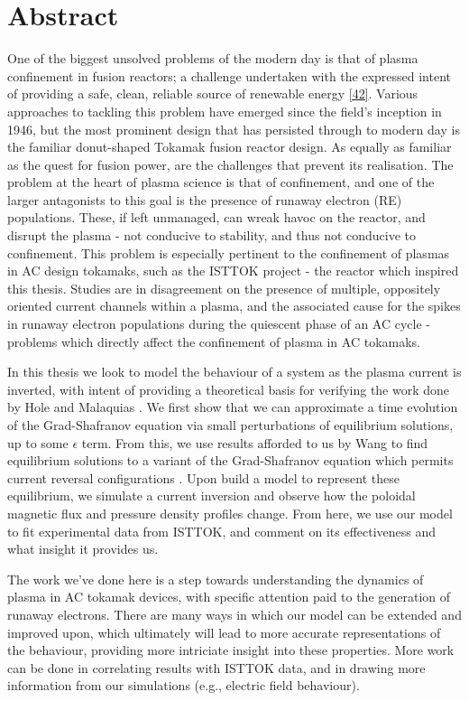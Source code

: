 \chapter*{Abstract}\label{abstract}


One of the biggest unsolved problems of the modern day is that of plasma confinement in fusion reactors; a challenge 
undertaken with the expressed intent of providing a safe, clean, reliable source of renewable energy \href{https://www.youtube.com/watch?v=dQw4w9WgXcQ}{[42]}. Various approaches 
to tackling this problem have emerged since the field's inception in 1946, but the most prominent design that has 
persisted through to modern day is the familiar donut-shaped Tokamak fusion reactor design. As equally as familiar as 
the quest for fusion power, are the challenges that prevent its realisation. The problem at the heart of plasma science is that 
of confinement, and one of the larger antagonists to this goal is the presence of runaway electron (RE) populations. 
These, if left unmanaged, can wreak havoc on the reactor, and disrupt the plasma - not conducive to stability, and thus 
not conducive to confinement. This problem is especially pertinent to the confinement of plasmas in AC design tokamaks, such as 
the ISTTOK project - the reactor which inspired this thesis. Studies are in disagreement on the presence of multiple, oppositely 
oriented current channels within a plasma, and the associated cause for the spikes in runaway electron populations during the 
quiescent phase of an AC cycle \cite{malaquias-matthew} - problems which directly affect the confinement of plasma in AC tokamaks. 

In this thesis we look to model the behaviour of a system as the plasma current is inverted, with intent of providing 
a theoretical basis for verifying the work done by Hole and Malaquias \cite{malaquias-matthew}. We first show that we 
can approximate a time evolution of the Grad-Shafranov equation via small perturbations of equilibrium solutions, up to 
some $\epsilon$ term. From this, we use results afforded to us by Wang to find equilibrium solutions to a variant of the 
Grad-Shafranov equation which permits current reversal configurations \cite{wang-analytic-solution}. Upon build a model 
to represent these equilibrium, we simulate a current inversion and observe how the poloidal magnetic flux and pressure 
density profiles change. From here, we use our model to fit experimental data from ISTTOK, and comment on its effectiveness 
and what insight it provides us.

The work we've done here is a step towards understanding the dynamics of plasma in AC tokamak devices, with specific 
attention paid to the generation of runaway electrons. There are many ways in which our model can be extended and improved 
upon, which ultimately will lead to more accurate representations of the behaviour, providing more intriciate insight 
into these properties. More work can be done in correlating results with ISTTOK data, and in drawing more information 
from our simulations (e.g., electric field behaviour). 